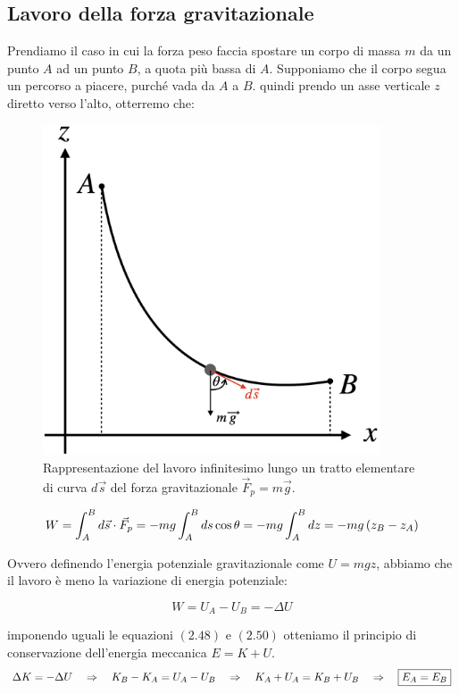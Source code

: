 \subsection{Lavoro della forza gravitazionale}
Prendiamo il caso in cui la forza peso faccia spostare un corpo di massa $m$ da un punto $A$ ad un punto $B$, a quota più bassa di $A$. Supponiamo che il corpo segua un percorso a piacere, purché vada da $A$ a $B$. quindi prendo un asse verticale $z$ diretto verso l'alto, otterremo che:
\begin{figure}[htbp]
\begin{center}
\includegraphics[width=10cm]{images/lavorog.png}
\caption{Rappresentazione del lavoro infinitesimo lungo un tratto elementare di curva $d\vec s$ del forza gravitazionale $\vec F_p = m\vec g$.}
\label{default}
\end{center}
\end{figure}

\begin{equation}
W = \int_A^Bd\vec s \cdot\vec F_p = -mg\int_A^Bds\cos\theta = -mg\int_A^Bdz = -mg\left( z_B-z_A\right)
\end{equation}

Ovvero definendo l'energia potenziale gravitazionale come $U = mgz$, abbiamo che il lavoro è meno la variazione di energia potenziale:

\begin{equation}
W = U_A-U_B = -\Delta U
\end{equation}

imponendo uguali le equazioni $(2.48)$ e $(2.50)$ otteniamo il principio di conservazione dell'energia meccanica $E = K + U$.
\begin{equation}
\Delta K = -\Delta U\quad\Rightarrow\quad K_B-K_A = U_A -U_B\quad\Rightarrow\quad K_A+U_A = K_B+U_B\quad\Rightarrow\quad \boxed{E_A = E_B}
\end{equation}

